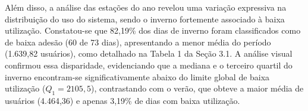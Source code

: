 \documentclass[12pt,a4paper]{article}
\begin{document}
Além disso, a análise das estações do ano revelou uma variação expressiva na distribuição do uso do sistema, sendo o inverno fortemente associado à baixa utilização. Constatou-se que 82,19\% dos dias de inverno foram classificados como de baixa adesão (60 de 73 dias), apresentando a menor média do período (1.639,82 usuários), como detalhado na Tabela 1 da Seção 3.1. A análise visual confirmou essa disparidade, evidenciando que a mediana e o terceiro quartil do inverno encontram-se significativamente abaixo do limite global de baixa utilização ($Q_1 = 2105,5$), contrastando com o verão, que obteve a maior média de usuários (4.464,36) e apenas 3,19\% de dias com baixa utilização.
\end{document}
